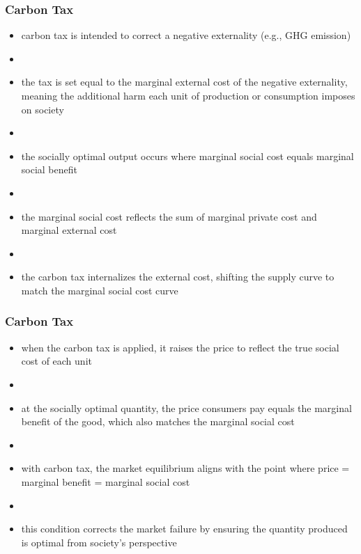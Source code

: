 \documentclass[blue]{beamer}
\begin{document}
      \begin{frame} \frametitle{Carbon Tax}
\label{GHG comparison}

\begin{itemize}
\item carbon tax is intended to correct a negative externality (e.g.,  GHG emission)
\item[]
 \item the tax is set equal to the marginal external cost of the negative externality, meaning the additional harm each unit of production or consumption imposes on society
 \item[]
\item the socially optimal output occurs where marginal social cost equals marginal social benefit
\item[]
\item the marginal social cost reflects the sum of marginal private cost and marginal external cost 
\item[]
\item the carbon tax internalizes the external cost, shifting the supply curve to match the marginal social cost curve

\end{itemize}
 \end{frame}




      \begin{frame} \frametitle{Carbon Tax}
\label{GHG comparison}

\begin{itemize}

\item when the carbon tax is applied, it raises the price to reflect the true social cost of each unit
\item[]
\item at the socially optimal quantity, the price consumers pay equals the marginal benefit of the good, which also matches the marginal social cost
\item[]
\item with carbon tax, the market equilibrium aligns with the point where price = marginal benefit = marginal social cost
\item[]
\item this condition corrects the market failure by ensuring the quantity produced is optimal from society's perspective
\end{itemize}
 \end{frame}
\end{document}
